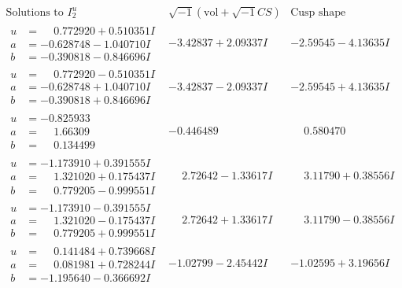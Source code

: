 \documentclass[1p]{elsarticle_modified}
\theoremstyle{definition}
\newcommand{\I}{\sqrt{-1}}
\begin{document}
$$\begin{array}{c|c|c}  
\text{Solutions to }I^u_{2}& \I (\text{vol} + \sqrt{-1}CS) & \text{Cusp shape}\\
 \hline 
\begin{aligned}
u &= \phantom{-}0.772920 + 0.510351 I \\
a &= -0.628748 - 1.040710 I \\
b &= -0.390818 - 0.846696 I\end{aligned}
 & -3.42837 + 2.09337 I & -2.59545 - 4.13635 I \\ \hline\begin{aligned}
u &= \phantom{-}0.772920 - 0.510351 I \\
a &= -0.628748 + 1.040710 I \\
b &= -0.390818 + 0.846696 I\end{aligned}
 & -3.42837 - 2.09337 I & -2.59545 + 4.13635 I \\ \hline\begin{aligned}
u &= -0.825933\phantom{ +0.000000I} \\
a &= \phantom{-}1.66309\phantom{ +0.000000I} \\
b &= \phantom{-}0.134499\phantom{ +0.000000I}\end{aligned}
 & -0.446489\phantom{ +0.000000I} & \phantom{-}0.580470\phantom{ +0.000000I} \\ \hline\begin{aligned}
u &= -1.173910 + 0.391555 I \\
a &= \phantom{-}1.321020 + 0.175437 I \\
b &= \phantom{-}0.779205 - 0.999551 I\end{aligned}
 & \phantom{-}2.72642 - 1.33617 I & \phantom{-}3.11790 + 0.38556 I \\ \hline\begin{aligned}
u &= -1.173910 - 0.391555 I \\
a &= \phantom{-}1.321020 - 0.175437 I \\
b &= \phantom{-}0.779205 + 0.999551 I\end{aligned}
 & \phantom{-}2.72642 + 1.33617 I & \phantom{-}3.11790 - 0.38556 I \\ \hline\begin{aligned}
u &= \phantom{-}0.141484 + 0.739668 I \\
a &= \phantom{-}0.081981 + 0.728244 I \\
b &= -1.195640 - 0.366692 I\end{aligned}
 & -1.02799 - 2.45442 I & -1.02595 + 3.19656 I \\ \hline\begin{aligned}

\end{aligned}
\end{array}$$
\end{document}
